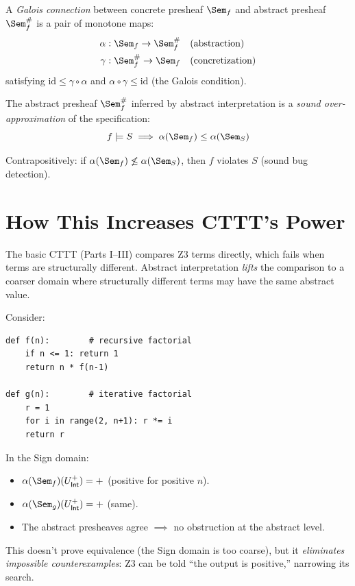 \begin{definition}
A \emph{Galois connection} between concrete presheaf $\Sem_f$ and
abstract presheaf $\Sem_f^\#$ is a pair of monotone maps:
\begin{align}
  \alpha &: \Sem_f \to \Sem_f^\# && \text{(abstraction)} \\
  \gamma &: \Sem_f^\# \to \Sem_f && \text{(concretization)}
\end{align}
satisfying $\mathrm{id} \leq \gamma \circ \alpha$ and
$\alpha \circ \gamma \leq \mathrm{id}$ (the Galois condition).
\end{definition}

\begin{theorem}
\label{thm:abstract-spec}
The abstract presheaf $\Sem_f^\#$ inferred by abstract interpretation
is a \emph{sound over-approximation} of the specification:
\[
  f \models S \implies \alpha(\Sem_f) \leq \alpha(\Sem_S)
\]

Contrapositively: if $\alpha(\Sem_f) \not\leq \alpha(\Sem_S)$, then
$f$ violates $S$ (sound bug detection).
\end{theorem}

\section{How This Increases CTTT's Power}

The basic CTTT (Parts I--III) compares Z3 terms directly, which
fails when terms are structurally different.  Abstract interpretation
\emph{lifts} the comparison to a coarser domain where structurally
different terms may have the same abstract value.

\begin{example}
Consider:
\begin{lstlisting}
def f(n):        # recursive factorial
    if n <= 1: return 1
    return n * f(n-1)

def g(n):        # iterative factorial
    r = 1
    for i in range(2, n+1): r *= i
    return r
\end{lstlisting}

In the Sign domain:
\begin{itemize}
  \item $\alpha(\Sem_f)(U_\mathsf{Int}^{+}) = +$ (positive for positive $n$).
  \item $\alpha(\Sem_g)(U_\mathsf{Int}^{+}) = +$ (same).
  \item The abstract presheaves agree $\implies$ no obstruction
    at the abstract level.
\end{itemize}

This doesn't prove equivalence (the Sign domain is too coarse), but
it \emph{eliminates impossible counterexamples}: Z3 can be told
``the output is positive,'' narrowing its search.
\end{example}

